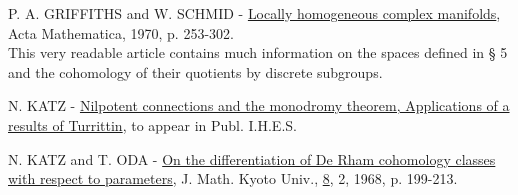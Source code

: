 \documentclass[10pt,leqno]{article}
\theoremstyle{deligne}
\begin{document}
\begin{enumerate}[label={[\arabic*]},leftmargin=2.8em]
\item P. A. GRIFFITHS and W. SCHMID - \uline{Locally homogeneous complex manifolds}, Acta Mathematica, 1970, p. 253-302.\\
This very readable article contains much information on the spaces defined in § 5 and the cohomology of their quotients by discrete subgroups.

\item N. KATZ - \uline{Nilpotent connections and the monodromy theorem, Applications of a results of Turrittin}, to appear in Publ. I.H.E.S.

\item N. KATZ and T. ODA - \uline{On the differentiation of De Rham cohomology classes with respect to parameters}, J. Math. Kyoto Univ., \uline{8}, 2, 1968, p. 199-213.
\end{enumerate}
\end{document}
